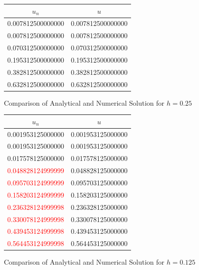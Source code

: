 \documentclass[a4paper,12pt]{article}
\makeatletter
\newenvironment{tablehere}
  {\def\@captype{table}}
  {}
\makeatother
\begin{document}
\begin{center}
\begin{tablehere}
\begin{tabular}{cc}
 $ u_n $ & $u$ \\
\hline
\hline
0.007812500000000 & 0.007812500000000\\
0.007812500000000 & 0.007812500000000\\
0.070312500000000 & 0.070312500000000\\
0.195312500000000 & 0.195312500000000\\
0.382812500000000 & 0.382812500000000\\
0.632812500000000 & 0.632812500000000\\
\end{tabular}
\caption{Comparison of Analytical and Numerical Solution for $h = 0.25$}\label{tab:linear1dcoupl2}
\end{tablehere}
\end{center}
\begin{center}
\begin{tablehere}
\centering
\begin{tabular}{cc}
 $ u_n $ & $u$ \\
\hline
\hline
0.001953125000000 & 0.001953125000000\\
0.001953125000000 & 0.001953125000000\\
0.017578125000000 & 0.017578125000000\\
\textcolor{red}{0.048828124999999} & 0.048828125000000\\
\textcolor{red}{0.095703124999999} & 0.095703125000000\\
\textcolor{red}{0.158203124999999} & 0.158203125000000\\
\textcolor{red}{0.236328124999998} & 0.236328125000000\\
\textcolor{red}{0.330078124999998} & 0.330078125000000\\
\textcolor{red}{0.439453124999998} & 0.439453125000000\\
\textcolor{red}{0.564453124999998} & 0.564453125000000\\
\end{tabular}
\caption{Comparison of Analytical and Numerical Solution for $h = 0.125$}\label{tab:linear1dcoupl3}
\end{tablehere}
\end{center}
\end{document}
